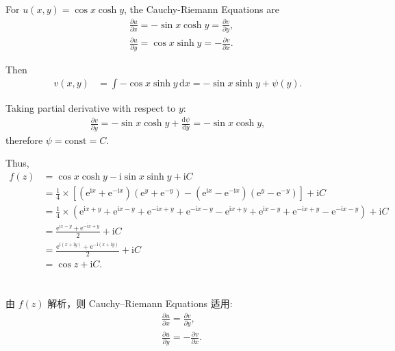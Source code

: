 \documentclass[12pt]{article}
\begin{document}
\subsection{}
For \( u(x,y) = \cos x \cosh y \), the Cauchy-Riemann Equations are
\begin{align*}
&\frac{\partial u}{\partial x} = -\sin x \cosh y = \frac{\partial v}{\partial y}, \\
&\frac{\partial u}{\partial y} = \cos x \sinh y = -\frac{\partial v}{\partial x}.
\end{align*}

Then
\begin{align*}
v(x,y) &= \int -\cos x \sinh y \, \mathrm{d}x = -\sin x \sinh y + \psi(y).
\end{align*}

Taking partial derivative with respect to \( y \):
\begin{align*}
\frac{\partial v}{\partial y} = -\sin x \cosh y + \frac{\mathrm{d}\psi}{\mathrm{d}y} = -\sin x \cosh y,
\end{align*}
therefore \( \psi = \text{const} = C \).

Thus,
\begin{align*}
f(z) &= \cos x \cosh y - \mathrm{i} \sin x \sinh y + \mathrm{i}C \\
&= \frac{1}{4}\times \left[ (\mathrm{e}^{\mathrm{i}x} + \mathrm{e}^{-\mathrm{i}x})(\mathrm{e}^y + \mathrm{e}^{-y}) - (\mathrm{e}^{\mathrm{i}x} - \mathrm{e}^{-\mathrm{i}x})(\mathrm{e}^y - \mathrm{e}^{-y}) \right] + \mathrm{i}C \\
&= \frac{1}{4} \times\left( \mathrm{e}^{\mathrm{i}x+y} + \mathrm{e}^{\mathrm{i}x-y} + \mathrm{e}^{-\mathrm{i}x+y} + \mathrm{e}^{-\mathrm{i}x-y} - \mathrm{e}^{\mathrm{i}x+y} + \mathrm{e}^{\mathrm{i}x-y} + \mathrm{e}^{-\mathrm{i}x+y} - \mathrm{e}^{-\mathrm{i}x-y} \right) + \mathrm{i}C \\
&= \frac{\mathrm{e}^{\mathrm{i}x-y} + \mathrm{e}^{-\mathrm{i}x+y}}{2} + \mathrm{i}C \\
&= \frac{\mathrm{e}^{\mathrm{i}(x+\mathrm{i}y)} + \mathrm{e}^{-\mathrm{i}(x+\mathrm{i}y)}}{2} + \mathrm{i}C \\
&= \cos z + \mathrm{i}C.
\end{align*}
\section{}
由 \( f(z) \) 解析，则 Cauchy–Riemann Equations 适用:
\begin{align*}
&\frac{\partial u}{\partial {x}} = \frac{\partial v}{\partial {y}}, \\
&\frac{\partial u}{\partial {y}} = -\frac{\partial v}{\partial {x}}.
\end{align*}
\end{document}
